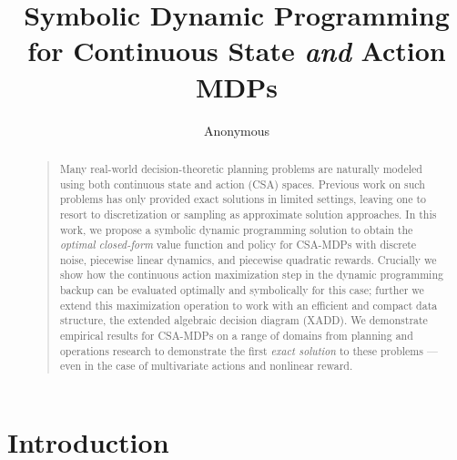 \documentclass[letterpaper]{article}
\begin{document}
%
\title{Symbolic Dynamic Programming for Continuous State \emph{and} Action MDPs}
\author{Anonymous}
\maketitle
\begin{abstract}
\begin{quote}
Many real-world decision-theoretic planning problems are naturally
modeled using both continuous state and action (CSA) spaces.  Previous
work on such problems has only provided exact solutions in limited
settings, leaving one to resort to discretization or sampling as
approximate solution approaches.  In this work, we propose a symbolic
dynamic programming solution to obtain the \emph{optimal closed-form}
value function and policy for CSA-MDPs with discrete noise, piecewise
linear dynamics, and piecewise quadratic rewards.  Crucially we show
how the continuous action maximization step in the dynamic programming
backup can be evaluated optimally and symbolically for this case;
further we extend this maximization operation to work with an
efficient and compact data structure, the extended algebraic decision
diagram (XADD).  We demonstrate empirical results for CSA-MDPs on a
range of domains from planning and operations research to demonstrate
the first \emph{exact solution} to these problems --- even in the case
of multivariate actions and nonlinear reward.
\end{quote}
\end{abstract}

\section{Introduction}


\end{document}
